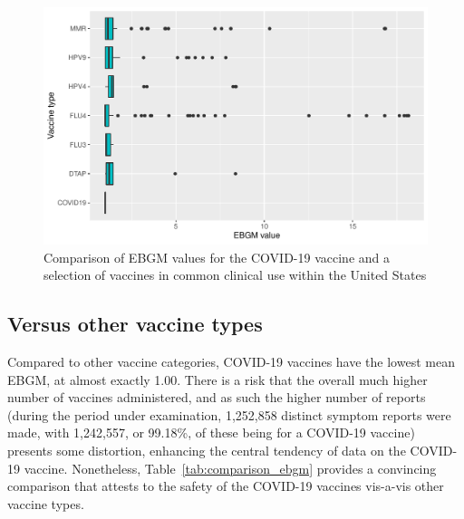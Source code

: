 \documentclass[preprints,communication,submit,oneauthor,pdftex]{Definitions/mdpi}
\begin{document}
\begin{figure}
 \centering 
 \includegraphics[scale=0.7]{vs_other_vax}
 \caption{Comparison of EBGM values for the COVID-19 vaccine and a selection of vaccines in common clinical use within the United States}
 \label{fig:vs_other_vax}
\end{figure}


\subsection{Versus other vaccine types} %
\label{sub:versus_other_vaccine_types}

Compared to other vaccine categories, COVID-19 vaccines have the lowest mean EBGM, at almost exactly 1.00. There is a risk that the overall much higher number of vaccines administered, and as such the higher number of reports (during the period under examination, 1,252,858 distinct symptom reports were made, with 1,242,557, or 99.18\%, of these being for a COVID-19 vaccine) presents some distortion, enhancing the central tendency of data on the COVID-19 vaccine. Nonetheless, Table~\ref{tab:comparison_ebgm} provides a convincing comparison that attests to the safety of the COVID-19 vaccines vis-a-vis other vaccine types.
\end{document}
